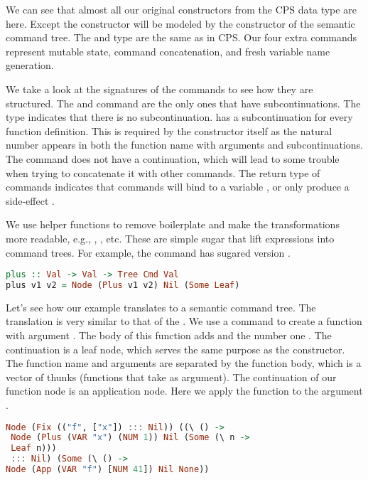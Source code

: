 We can see that almost all our original constructors from the \ac{CPS} data type are here. Except the  constructor will be modeled by the  constructor of the semantic command tree. The  and  type are the same as in \ac{CPS}. Our four extra commands represent mutable state, command concatenation, and fresh variable name generation.

We take a look at the signatures of the commands to see how they are structured. The  and  command are the only ones that have subcontinuations. The  type indicates that there is no subcontinuation.  has a subcontinuation for every function definition. This is required by the constructor itself as the natural number  appears in both the function name with arguments and subcontinuations. The  command does not have a continuation, which will lead to some trouble when trying to concatenate it with other commands. The return type of commands indicates that commands will bind to a variable , or only produce a side-effect \icode{()}.

We use helper functions to remove boilerplate and make the transformations more readable, e.g., , , etc. These are simple sugar that lift expressions into command trees. For example, the  command has sugared version .

\begin{lstlisting}[language=Haskell]
plus :: Val -> Val -> Tree Cmd Val
plus v1 v2 = Node (Plus v1 v2) Nil (Some Leaf)
\end{lstlisting}

Let's see how our example  translates to a semantic command tree. The translation is very similar to that of the . We use a  command to create a function  with argument . The body of this function adds  and the number one . The continuation is a leaf node, which serves the same purpose as the  constructor. The function name and arguments are separated by the function body, which is a vector of thunks (functions that take \icode{()} as argument). The continuation of our function node is an application node. Here we apply the function  to the argument .
  
\begin{lstlisting}[language=Haskell]
Node (Fix (("f", ["x"]) ::: Nil)) ((\ () ->
 Node (Plus (VAR "x") (NUM 1)) Nil (Some (\ n ->
 Leaf n)))
 ::: Nil) (Some (\ () ->
Node (App (VAR "f") [NUM 41]) Nil None))
\end{lstlisting}

